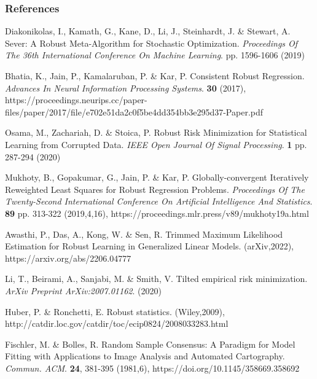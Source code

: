 \documentclass[
11pt, %
serif
]{beamer}
\begin{document}
	
	\begin{frame} %
		\frametitle{References}
		
		\begin{thebibliography}{99} %
			\footnotesize %
			
			Diakonikolas, I., Kamath, G., Kane, D., Li, J., Steinhardt, J. \& Stewart, A. Sever: A Robust Meta-Algorithm for Stochastic Optimization. {\em Proceedings Of The 36th International Conference On Machine Learning}. pp. 1596-1606 (2019)
			
			Bhatia, K., Jain, P., Kamalaruban, P. \& Kar, P. Consistent Robust Regression. {\em Advances In Neural Information Processing Systems}. \textbf{30} (2017), https://proceedings.neurips.cc/paper-files/paper/2017/file/e702e51da2c0f5be4dd354bb3e295d37-Paper.pdf
			
			Osama, M., Zachariah, D. \& Stoica, P. Robust Risk Minimization for Statistical Learning from Corrupted Data. {\em  IEEE Open Journal Of Signal Processing}. \textbf{1} pp. 287-294 (2020)
			
			Mukhoty, B., Gopakumar, G., Jain, P. \& Kar, P. Globally-convergent Iteratively Reweighted Least Squares for Robust Regression Problems. {\em Proceedings Of The Twenty-Second International Conference On Artificial Intelligence And Statistics}. \textbf{89} pp. 313-322 (2019,4,16), https://proceedings.mlr.press/v89/mukhoty19a.html
						
			Awasthi, P., Das, A., Kong, W. \& Sen, R. Trimmed Maximum Likelihood Estimation for Robust Learning in Generalized Linear Models. (arXiv,2022), https://arxiv.org/abs/2206.04777
						
			Li, T., Beirami, A., Sanjabi, M. \& Smith, V. Tilted empirical risk minimization. {\em ArXiv Preprint ArXiv:2007.01162}. (2020)
			
			Huber, P. \& Ronchetti, E. Robust statistics. (Wiley,2009), http://catdir.loc.gov/catdir/toc/ecip0824/2008033283.html
			
			Fischler, M. \& Bolles, R. Random Sample Consensus: A Paradigm for Model Fitting with Applications to Image Analysis and Automated Cartography. {\em Commun. ACM}. \textbf{24}, 381-395 (1981,6), https://doi.org/10.1145/358669.358692
			
		\end{thebibliography}
	\end{frame}
	
\end{document}
